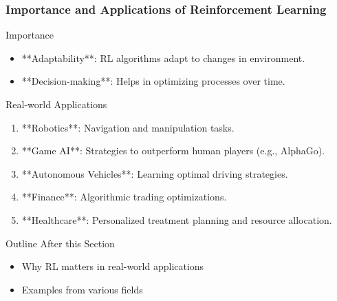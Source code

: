 \documentclass[aspectratio=169]{beamer}
\begin{document}
\begin{frame}[fragile]
    \frametitle{Importance and Applications of Reinforcement Learning}
    
    \begin{block}{Importance}
        \begin{itemize}
            \item **Adaptability**: RL algorithms adapt to changes in environment.
            \item **Decision-making**: Helps in optimizing processes over time.
        \end{itemize}
    \end{block}
    
    \begin{block}{Real-world Applications}
        \begin{enumerate}
            \item **Robotics**: Navigation and manipulation tasks.
            \item **Game AI**: Strategies to outperform human players (e.g., AlphaGo).
            \item **Autonomous Vehicles**: Learning optimal driving strategies.
            \item **Finance**: Algorithmic trading optimizations.
            \item **Healthcare**: Personalized treatment planning and resource allocation.
        \end{enumerate}
    \end{block}
    
    \begin{block}{Outline After this Section}
        \begin{itemize}
            \item Why RL matters in real-world applications
            \item Examples from various fields
        \end{itemize}
    \end{block}
\end{frame}
\end{document}
